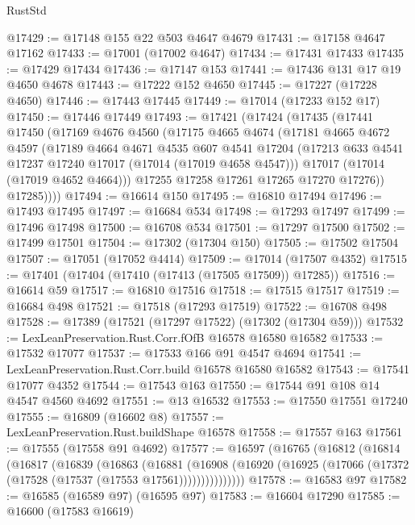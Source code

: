 \begin{lexlean}{RustStd}
\begin{coremodule}
@17429 := @17148 @155 @22 @503 @4647 @4679
@17431 := @17158 @4647 @17162
@17433 := @17001 (@17002 @4647)
@17434 := @17431 @17433
@17435 := @17429 @17434
@17436 := @17147 @153
@17441 := @17436 @131 @17 @19 @4650 @4678
@17443 := @17222 @152 @4650
@17445 := @17227 (@17228 @4650)
@17446 := @17443 @17445
@17449 := @17014 (@17233 @152 @17)
@17450 := @17446 @17449
@17493 := @17421
    (@17424
      (@17435
        (@17441
          @17450
          (@17169
            @4676
            @4560
            (@17175
              @4665
              @4674
              (@17181
                @4665
                @4672
                @4597
                (@17189
                  @4664
                  @4671
                  @4535
                  @607
                  @4541
                  @17204
                  (@17213 @633 @4541 @17237 @17240 @17017 (@17014 (@17019 @4658 @4547)))
                  @17017
                  (@17014 (@17019 @4652 @4664)))
                @17255
                @17258
                @17261
                @17265
                @17270
                @17276))
            @17285))))
@17494 := @16614 @150
@17495 := @16810 @17494
@17496 := @17493 @17495
@17497 := @16684 @534
@17498 := @17293 @17497
@17499 := @17496 @17498
@17500 := @16708 @534
@17501 := @17297 @17500
@17502 := @17499 @17501
@17504 := @17302 (@17304 @150)
@17505 := @17502 @17504
@17507 := @17051 (@17052 @4414)
@17509 := @17014 (@17507 @4352)
@17515 := @17401 (@17404 (@17410 (@17413 (@17505 @17509)) @17285))
@17516 := @16614 @59
@17517 := @16810 @17516
@17518 := @17515 @17517
@17519 := @16684 @498
@17521 := @17518 (@17293 @17519)
@17522 := @16708 @498
@17528 := @17389 (@17521 (@17297 @17522) (@17302 (@17304 @59)))
@17532 := LexLeanPreservation.Rust.Corr.fOfB @16578 @16580 @16582
@17533 := @17532 @17077
@17537 := @17533 @166 @91 @4547 @4694
@17541 := LexLeanPreservation.Rust.Corr.build @16578 @16580 @16582
@17543 := @17541 @17077 @4352
@17544 := @17543 @163
@17550 := @17544 @91 @108 @14 @4547 @4560 @4692
@17551 := @13 @16532
@17553 := @17550 @17551 @17240
@17555 := @16809 (@16602 @8)
@17557 := LexLeanPreservation.Rust.buildShape @16578
@17558 := @17557 @163
@17561 := @17555 (@17558 @91 @4692)
@17577 := @16597
    (@16765
      (@16812
        (@16814
          (@16817
            (@16839
              (@16863
                (@16881
                  (@16908
                    (@16920 (@16925 (@17066 (@17372 (@17528 (@17537 (@17553 @17561)))))))))))))))
@17578 := @16583 @97
@17582 := @16585 (@16589 @97) (@16595 @97)
@17583 := @16604 @17290
@17585 := @16600 (@17583 @16619)

\end{coremodule}
\end{lexlean}
